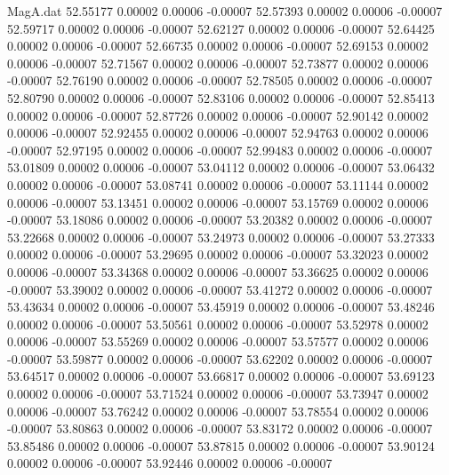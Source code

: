 \begin{filecontents}{MagA.dat}
  52.55177    0.00002    0.00006   -0.00007
  52.57393    0.00002    0.00006   -0.00007
  52.59717    0.00002    0.00006   -0.00007
  52.62127    0.00002    0.00006   -0.00007
  52.64425    0.00002    0.00006   -0.00007
  52.66735    0.00002    0.00006   -0.00007
  52.69153    0.00002    0.00006   -0.00007
  52.71567    0.00002    0.00006   -0.00007
  52.73877    0.00002    0.00006   -0.00007
  52.76190    0.00002    0.00006   -0.00007
  52.78505    0.00002    0.00006   -0.00007
  52.80790    0.00002    0.00006   -0.00007
  52.83106    0.00002    0.00006   -0.00007
  52.85413    0.00002    0.00006   -0.00007
  52.87726    0.00002    0.00006   -0.00007
  52.90142    0.00002    0.00006   -0.00007
  52.92455    0.00002    0.00006   -0.00007
  52.94763    0.00002    0.00006   -0.00007
  52.97195    0.00002    0.00006   -0.00007
  52.99483    0.00002    0.00006   -0.00007
  53.01809    0.00002    0.00006   -0.00007
  53.04112    0.00002    0.00006   -0.00007
  53.06432    0.00002    0.00006   -0.00007
  53.08741    0.00002    0.00006   -0.00007
  53.11144    0.00002    0.00006   -0.00007
  53.13451    0.00002    0.00006   -0.00007
  53.15769    0.00002    0.00006   -0.00007
  53.18086    0.00002    0.00006   -0.00007
  53.20382    0.00002    0.00006   -0.00007
  53.22668    0.00002    0.00006   -0.00007
  53.24973    0.00002    0.00006   -0.00007
  53.27333    0.00002    0.00006   -0.00007
  53.29695    0.00002    0.00006   -0.00007
  53.32023    0.00002    0.00006   -0.00007
  53.34368    0.00002    0.00006   -0.00007
  53.36625    0.00002    0.00006   -0.00007
  53.39002    0.00002    0.00006   -0.00007
  53.41272    0.00002    0.00006   -0.00007
  53.43634    0.00002    0.00006   -0.00007
  53.45919    0.00002    0.00006   -0.00007
  53.48246    0.00002    0.00006   -0.00007
  53.50561    0.00002    0.00006   -0.00007
  53.52978    0.00002    0.00006   -0.00007
  53.55269    0.00002    0.00006   -0.00007
  53.57577    0.00002    0.00006   -0.00007
  53.59877    0.00002    0.00006   -0.00007
  53.62202    0.00002    0.00006   -0.00007
  53.64517    0.00002    0.00006   -0.00007
  53.66817    0.00002    0.00006   -0.00007
  53.69123    0.00002    0.00006   -0.00007
  53.71524    0.00002    0.00006   -0.00007
  53.73947    0.00002    0.00006   -0.00007
  53.76242    0.00002    0.00006   -0.00007
  53.78554    0.00002    0.00006   -0.00007
  53.80863    0.00002    0.00006   -0.00007
  53.83172    0.00002    0.00006   -0.00007
  53.85486    0.00002    0.00006   -0.00007
  53.87815    0.00002    0.00006   -0.00007
  53.90124    0.00002    0.00006   -0.00007
  53.92446    0.00002    0.00006   -0.00007

\end{filecontents}
